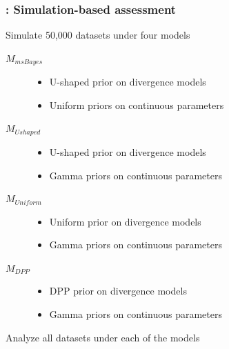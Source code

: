 \begin{frame}
    \frametitle{\dppmsbayes: Simulation-based assessment}
        Simulate 50,000 datasets under four models\\
        \smallskip
        \begin{description}
            \item[$M_{msBayes}$]
                \begin{itemize}
                    \item U-shaped prior on divergence models
                    \item Uniform priors on continuous parameters
                \end{itemize}
            \smallskip
            \item[$M_{Ushaped}$]
                \begin{itemize}
                    \item U-shaped prior on divergence models
                    \item Gamma priors on continuous parameters
                \end{itemize}
            \smallskip
            \item[$M_{Uniform}$]
                \begin{itemize}
                    \item Uniform prior on divergence models
                    \item Gamma priors on continuous parameters
                \end{itemize}
            \smallskip
            \item[$M_{DPP}$]
                \begin{itemize}
                    \item DPP prior on divergence models
                    \item Gamma priors on continuous parameters
                \end{itemize}
        \end{description}
        \smallskip
        Analyze all datasets under each of the models
\end{frame}


